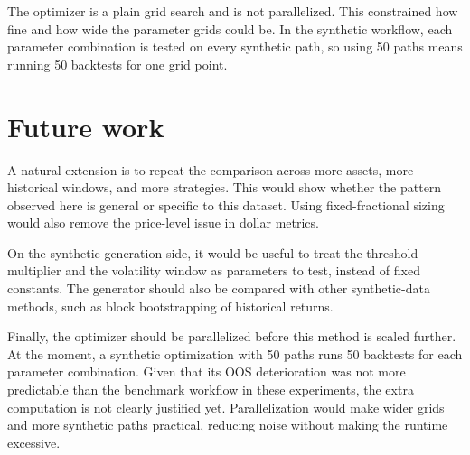 The optimizer is a plain grid search and is not parallelized. This constrained how fine and how wide
the parameter grids could be. In the synthetic workflow, each parameter combination is tested on every
synthetic path, so using 50 paths means running 50 backtests for one grid point.

\section{Future work}

A natural extension is to repeat the comparison across more assets, more historical windows, and more
strategies. This would show whether the pattern observed here is general or specific to this dataset.
Using fixed-fractional sizing would also remove the price-level issue in dollar metrics.

On the synthetic-generation side, it would be useful to treat the threshold multiplier and the
volatility window as parameters to test, instead of fixed constants. The generator should also be
compared with other synthetic-data methods, such as block bootstrapping of historical returns.

Finally, the optimizer should be parallelized before this method is scaled further. At the moment, a
synthetic optimization with 50 paths runs 50 backtests for each parameter combination. Given that its
OOS deterioration was not more predictable than the benchmark workflow in these experiments, the extra
computation is not clearly justified yet. Parallelization would make wider grids and more synthetic
paths practical, reducing noise without making the runtime excessive.
